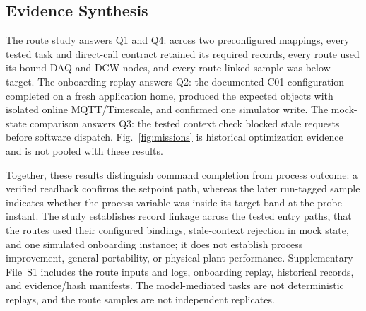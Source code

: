 \subsection{Evidence Synthesis}
The route study answers Q1 and Q4: across two preconfigured mappings, every
tested task and direct-call contract retained its required records, every route
used its bound DAQ and DCW nodes, and every route-linked sample was below
target. The onboarding replay answers Q2: the documented C01 configuration
completed on a fresh application home, produced the expected objects with
isolated online MQTT/Timescale, and confirmed one simulator write. The
mock-state comparison answers Q3: the tested context check blocked stale
requests before software dispatch. Fig.~\ref{fig:missions} is historical
optimization evidence and is not pooled with these results.

Together, these results distinguish command completion from process outcome:
a verified readback confirms the setpoint path, whereas the later run-tagged
sample indicates whether the process variable was inside its target band at
the probe instant. The study establishes record linkage across the tested entry
paths, that the routes used their configured bindings, stale-context rejection
in mock state, and one simulated onboarding instance; it does not establish
process improvement, general portability, or physical-plant performance. Supplementary File~S1 includes the route inputs
and logs, onboarding replay, historical records, and evidence/hash manifests.
The model-mediated tasks are not deterministic replays, and the route samples
are not independent replicates.
